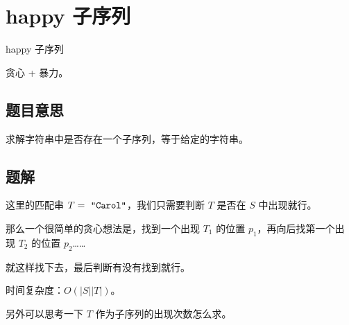 \def\sectionName{happy 子序列}
\section[\TOCName]{\sectionName}



\begin{frame}

\isBeamerMode\relax
    {\Huge \sectionName}\par
\fi




贪心 + 暴力。



\end{frame}

\subsection{题目意思}
\begin{frame} %
求解字符串中是否存在一个子序列，等于给定的字符串。
\end{frame}



\subsection{题解}
\begin{frame} %
这里的匹配串 $T = \text{ \texttt{"Carol"}}$，我们只需要判断 $T$ 是否在 $S$ 中出现就行。

那么一个很简单的贪心想法是，找到一个出现 $T_1$ 的位置 $p_1$，再向后找第一个出
现 $T_2$ 的位置 $p_2$……

就这样找下去，最后判断有没有找到就行。

时间复杂度：$O(|S||T|)$。

另外可以思考一下 $T$ 作为子序列的出现次数怎么求。
\end{frame}
